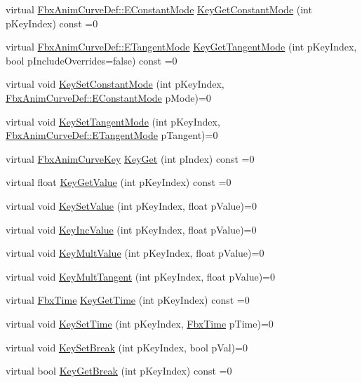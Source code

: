 \begin{DoxyCompactItemize}
\item 
virtual \hyperlink{class_fbx_anim_curve_def_a52885abd392ac8ac3da94bafc5fddd64}{Fbx\+Anim\+Curve\+Def\+::\+E\+Constant\+Mode} \hyperlink{class_fbx_anim_curve_a990e2b6b948eec3562abc2c74b6d0ef2}{Key\+Get\+Constant\+Mode} (int p\+Key\+Index) const =0
\item 
virtual \hyperlink{class_fbx_anim_curve_def_ac810ccc5ca0527704ab5175479964b87}{Fbx\+Anim\+Curve\+Def\+::\+E\+Tangent\+Mode} \hyperlink{class_fbx_anim_curve_a5672d86518e0ceb21c4bcaf78f7f5bf6}{Key\+Get\+Tangent\+Mode} (int p\+Key\+Index, bool p\+Include\+Overrides=false) const =0
\item 
virtual void \hyperlink{class_fbx_anim_curve_a195063224af388d7064dc13910a89cb9}{Key\+Set\+Constant\+Mode} (int p\+Key\+Index, \hyperlink{class_fbx_anim_curve_def_a52885abd392ac8ac3da94bafc5fddd64}{Fbx\+Anim\+Curve\+Def\+::\+E\+Constant\+Mode} p\+Mode)=0
\item 
virtual void \hyperlink{class_fbx_anim_curve_a13fa9ecd9e09a39f734cf5a3265ea0ff}{Key\+Set\+Tangent\+Mode} (int p\+Key\+Index, \hyperlink{class_fbx_anim_curve_def_ac810ccc5ca0527704ab5175479964b87}{Fbx\+Anim\+Curve\+Def\+::\+E\+Tangent\+Mode} p\+Tangent)=0
\item 
virtual \hyperlink{class_fbx_anim_curve_key}{Fbx\+Anim\+Curve\+Key} \hyperlink{class_fbx_anim_curve_aec10e4a71979bd990d98cd002f29e82c}{Key\+Get} (int p\+Index) const =0
\item 
virtual float \hyperlink{class_fbx_anim_curve_a1d0a4728a6c8c1c0260fd368ba64ccb6}{Key\+Get\+Value} (int p\+Key\+Index) const =0
\item 
virtual void \hyperlink{class_fbx_anim_curve_aa974a3bbece0cd63fa4c4d3a7ad7fd99}{Key\+Set\+Value} (int p\+Key\+Index, float p\+Value)=0
\item 
virtual void \hyperlink{class_fbx_anim_curve_a38cdb5a33a9d7195f9e74b0fb4aa3261}{Key\+Inc\+Value} (int p\+Key\+Index, float p\+Value)=0
\item 
virtual void \hyperlink{class_fbx_anim_curve_a73262cd3affc5c9d098fda9a35a37779}{Key\+Mult\+Value} (int p\+Key\+Index, float p\+Value)=0
\item 
virtual void \hyperlink{class_fbx_anim_curve_a743514eebf5845d6bc13145e082a8ae5}{Key\+Mult\+Tangent} (int p\+Key\+Index, float p\+Value)=0
\item 
virtual \hyperlink{class_fbx_time}{Fbx\+Time} \hyperlink{class_fbx_anim_curve_a547f7842ea7bae5b5ed048d15b8b0d07}{Key\+Get\+Time} (int p\+Key\+Index) const =0
\item 
virtual void \hyperlink{class_fbx_anim_curve_a5ce2130d0cea4de2fc42fa3683f01162}{Key\+Set\+Time} (int p\+Key\+Index, \hyperlink{class_fbx_time}{Fbx\+Time} p\+Time)=0
\item 
virtual void \hyperlink{class_fbx_anim_curve_ae0137873a7e2c36679e9e747908b8317}{Key\+Set\+Break} (int p\+Key\+Index, bool p\+Val)=0
\item 
virtual bool \hyperlink{class_fbx_anim_curve_a401621f086458975b39fcbcef8e9be77}{Key\+Get\+Break} (int p\+Key\+Index) const =0
\end{DoxyCompactItemize}
